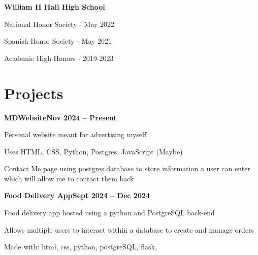 \documentclass[letterpaper,10pt]{article}
\newcommand{\heading}[2]{
  \hspace{10pt}#1\hfill#2\\
}
\newcommand{\headingBf}[2]{
  \heading{\textbf{#1}}{\textbf{#2}}
}
\newenvironment{resume_list}{
  \vspace{-7pt}
  \begin{itemize}[itemsep=-2px, parsep=1pt, leftmargin=30pt]
}{
  \end{itemize}
}
\begin{document}
  \vspace{5pt}
  \headingBf{William H Hall High School}{}
  \begin{resume_list}
    \item National Honor Society \hspace{2pt}-  May 2022 
    \item Spanish Honor Society - May 2021
    \item Academic High Honors - 2019-2023
  \end{resume_list}


  \section{Projects}

  \headingBf{MDWebsite}{Nov 2024 -- Present}
  \begin{resume_list}
    \item Personal website meant for advertising myself
    \item Uses HTML, CSS, Python, Postgres, JavaScript (Maybe)
    \item Contact Me page using postgres database to store information a user can enter which will allow me to contact them back
  \end{resume_list}

  \headingBf{Food Delivery App}{Sept 2024 -- Dec 2024}
  \begin{resume_list}
    \item Food delivery app hosted using a python and PostgreSQL back-end
    \item Allows multiple users to interact within a database to create and manage orders
    \item Made with: html, css, python, postgreSQL, flask, 
  \end{resume_list}
\end{document}
